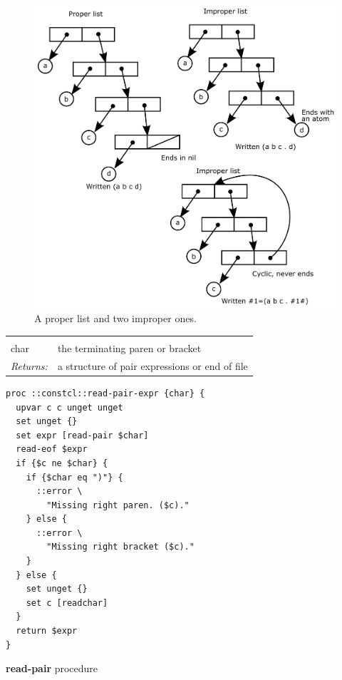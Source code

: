 \documentclass[twoside]{report}
\begin{document}
\begin{figure}[h!]\includegraphics{images/prop-improp.png}\captionsetup{labelformat=empty}\caption{A proper list and two improper ones.}\label{fig:a-proper-list-and-two-improper-ones}\end{figure}

\noindent\begin{tabular}{ |p{1.9cm} p{8cm}| }
\hline
\rowcolor[HTML]{CCCCCC} \multicolumn{2}{|l|}{\bf read-pair-expr (internal)} \\
char & the terminating paren or bracket \\
\textit{Returns:} & a structure of pair expressions or end of file \\
\hline
\end{tabular}

\begin{lstlisting}
proc ::constcl::read-pair-expr {char} {
  upvar c c unget unget
  set unget {}
  set expr [read-pair $char]
  read-eof $expr
  if {$c ne $char} {
    if {$char eq ")"} {
      ::error \
        "Missing right paren. ($c)."
    } else {
      ::error \
        "Missing right bracket ($c)."
    }
  } else {
    set unget {}
    set c [readchar]
  }
  return $expr
}
\end{lstlisting}

\textbf{read-pair} procedure
\end{document}
